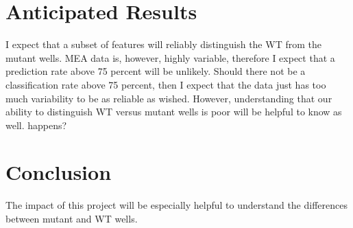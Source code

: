 \documentclass{article}\usepackage[]{graphicx}\usepackage[]{color}
\begin{document}
\section{Anticipated Results}
I expect that a subset of features will reliably distinguish the WT from the mutant wells. MEA data is, however, highly variable, therefore I expect that a prediction rate above 75 percent will be unlikely. Should there not be a classification rate above 75 percent, then I expect that the data just has too much variability to be as reliable as wished. However, understanding that our ability to distinguish WT versus mutant wells is poor will be helpful to know as well.
 happens?

\section{Conclusion}
The impact of this project will be especially helpful to understand the differences between mutant and WT wells.
\end{document}
